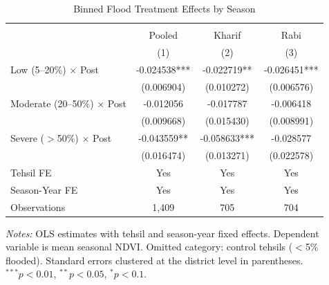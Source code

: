 \begin{table}[htbp]
\centering
\caption{Binned Flood Treatment Effects by Season}
\label{tab:binned}
\begin{tabular}{lccc}
\hline\hline
\\[-1.8ex]
 & Pooled & Kharif & Rabi \\
 & (1) & (2) & (3) \\
\hline
Low (5--20\%) $\times$ Post & -0.024538*** & -0.022719** & -0.026451*** \\
 & (0.006904) & (0.010272) & (0.006576) \\
Moderate (20--50\%) $\times$ Post & -0.012056 & -0.017787 & -0.006418 \\
 & (0.009668) & (0.015430) & (0.008991) \\
Severe ($>$50\%) $\times$ Post & -0.043559** & -0.058633*** & -0.028577 \\
 & (0.016474) & (0.013271) & (0.022578) \\
\hline
Tehsil FE & Yes & Yes & Yes \\
Season-Year FE & Yes & Yes & Yes \\
Observations & 1,409 & 705 & 704 \\
\hline\hline
\end{tabular}
\par\vspace{0.3em}
\small
\textit{Notes:} OLS estimates with tehsil and season-year fixed effects. Dependent variable is mean seasonal NDVI. Omitted category: control tehsils ($<$5\% flooded). Standard errors clustered at the district level in parentheses. $^{***}p<0.01$, $^{**}p<0.05$, $^{*}p<0.1$.

\end{table}
